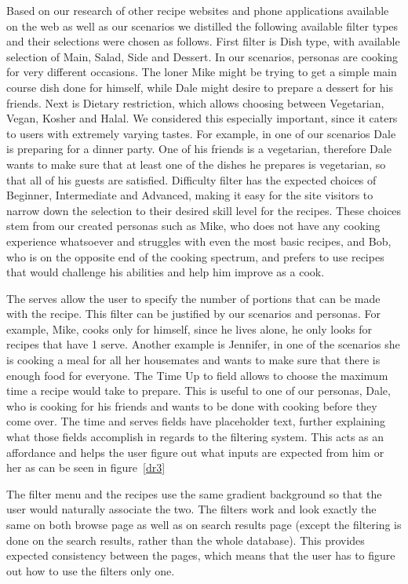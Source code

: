 Based on our research of other recipe websites and phone applications available on the web as well as our scenarios we distilled the following available filter types and their selections were chosen as follows. First filter is Dish type, with available selection of Main, Salad, Side and Dessert. In our scenarios, personas are cooking for very different occasions. The loner Mike might be trying to get a simple main course dish done for himself, while Dale might desire to prepare a dessert for his friends.  Next is Dietary restriction, which allows choosing between Vegetarian, Vegan, Kosher and Halal. We considered this especially important, since it caters to users with extremely varying tastes. For example, in one of our scenarios Dale is preparing for a dinner party. One of his friends is a vegetarian, therefore Dale wants to make sure that at least one of the dishes he prepares is vegetarian, so that all of his guests are satisfied. Difficulty filter has the expected choices of Beginner, Intermediate and Advanced, making it easy for the site visitors to narrow down the selection to their desired skill level for the recipes. These choices stem from our created personas such as Mike, who does not have any cooking experience whatsoever and struggles with even the most basic recipes, and Bob, who is on the opposite end of the cooking spectrum, and prefers to use recipes that would challenge his abilities and help him improve as a cook.  

The serves allow the user to specify the number of portions that can be made with the recipe. This filter can be justified by our scenarios and personas. For example, Mike, cooks only for himself, since he lives alone, he only looks for recipes that have 1 serve. Another example is Jennifer, in one of the scenarios she is cooking a meal for all her housemates and wants to make sure that there is enough food for everyone. The Time Up to field allows to choose the maximum time a recipe would take to prepare. This is useful to one of our personas, Dale, who is cooking for his friends and wants to be done with cooking before they come over. The time and serves fields have placeholder text, further explaining what those fields accomplish in regards to the filtering system. This acts as an affordance and helps the user figure out what inputs are expected from him or her as can be seen in figure~\ref{dr3}

The filter menu and the recipes use the same gradient background so that the user would naturally associate the two. The filters work and look exactly the same on both browse page as well as on search results page (except the filtering is done on the search results, rather than the whole database). This provides expected consistency between the pages, which means that the user has to figure out how to use the filters only one.

